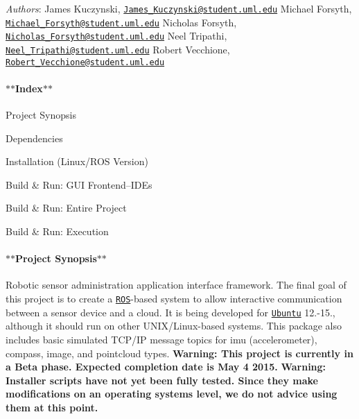 

{\itshape Authors}\-: James Kuczynski, \href{mailto:James_Kuczynski@student.uml.edu}{\tt James\-\_\-\-Kuczynski@student.\-uml.\-edu} Michael Forsyth, \href{mailto:Michael_Forsyth@student.uml.edu}{\tt Michael\-\_\-\-Forsyth@student.\-uml.\-edu} Nicholas Forsyth, \href{mailto:Nicholas_Forsyth@student.uml.edu}{\tt Nicholas\-\_\-\-Forsyth@student.\-uml.\-edu} Neel Tripathi, \href{mailto:Neel_Tripathi@student.uml.edu}{\tt Neel\-\_\-\-Tripathi@student.\-uml.\-edu} Robert Vecchione, \href{mailto:Robert_Vecchione@student.uml.edu}{\tt Robert\-\_\-\-Vecchione@student.\-uml.\-edu}

\paragraph*{$\ast$$\ast$\-Index$\ast$$\ast$}


\begin{DoxyItemize}
\item Project Synopsis
\item Dependencies
\item Installation (Linux/\-R\-O\-S Version)
\item Build \& Run\-: G\-U\-I Frontend--I\-D\-Es
\item Build \& Run\-: Entire Project
\item Build \& Run\-: Execution
\end{DoxyItemize}

\paragraph*{$\ast$$\ast$\-Project Synopsis$\ast$$\ast$}

Robotic sensor administration application interface framework. The final goal of this project is to create a \href{http://ros.org/}{\tt R\-O\-S}-\/based system to allow interactive communication between a sensor device and a cloud. It is being developed for \href{http://www.ubuntu.com/}{\tt Ubuntu} 12.-\/15., although it should run on other U\-N\-I\-X/\-Linux-\/based systems. This package also includes basic simulated T\-C\-P/\-I\-P message topics for imu (accelerometer), compass, image, and pointcloud types. {\bfseries Warning\-: This project is currently in a Beta phase. Expected completion date is May 4 2015.} {\bfseries Warning\-: Installer scripts have not yet been fully tested. Since they make modifications on an operating systems level, we do not advice using them at this point.}

